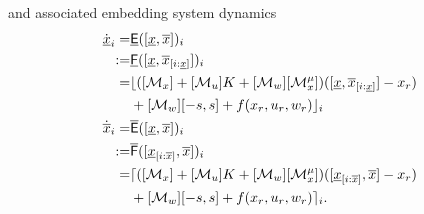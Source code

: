 \documentclass{IEEEojcsys}
\newcommand{\ul}{\underline}
\newcommand{\ol}{\overline}
\begin{document}
and associated embedding system dynamics
\begin{align}
    \dot{\ul{x}}_i= &\ul{\sfE}([\ul{x}, \ol{x}])_i \label{eq:final_mixed_emb_lower}\\
    := &\ul{\sfF}([\ul{x}, \ol{x}_{[i:\ul{x}]}])_i\nonumber\\
    =&\lfloor([\mathcal{M}_x] + [\mathcal{M}_u]K + [\mathcal{M}_w][\mathcal{M}^\mu_x])([\ulx, \olx_{[i:\ul{x}]}] - x_r) \nonumber\\
     &+ [\mathcal{M}_w][-s,s] + f(x_r, u_r, w_r)\rfloor_i\nonumber \\
    \dot{\ol{x}}_i= &\ol{\sfE}([\ul{x}, \ol{x}])_i \label{eq:final_mixed_emb_upper}\\
    := &\ol{\sfF}([\ul{x}_{[i:\ol{x}]}, \ol{x}])_i\nonumber \\
    =&\lceil([\mathcal{M}_x] + [\mathcal{M}_u]K + [\mathcal{M}_w][\mathcal{M}^\mu_x])([\ulx_{[i:\ol{x}]}, \olx] - x_r) \nonumber\\
     &+ [\mathcal{M}_w][-s,s] + f(x_r, u_r, w_r)\rceil_i.\nonumber
\end{align}
\end{document}
